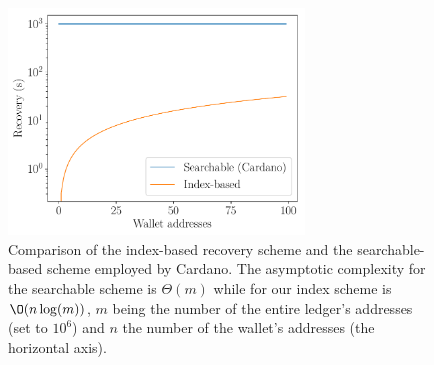 \begin{figure}
  \begin{center}
    \includegraphics[width=0.7\textwidth]{figures/delegation/recovery.pdf}
  \end{center}
    \caption{Comparison of the index-based recovery scheme and the
    searchable-based scheme employed by Cardano. The asymptotic complexity for
    the searchable scheme is $\Theta(m)$ while for our index scheme is
    $\O(n\log(m))$, $m$ being the number of the entire ledger's addresses (set
    to $10^6$) and $n$ the number of the wallet's addresses (the horizontal
    axis).}
  \label{graph:recovery}
\end{figure}

